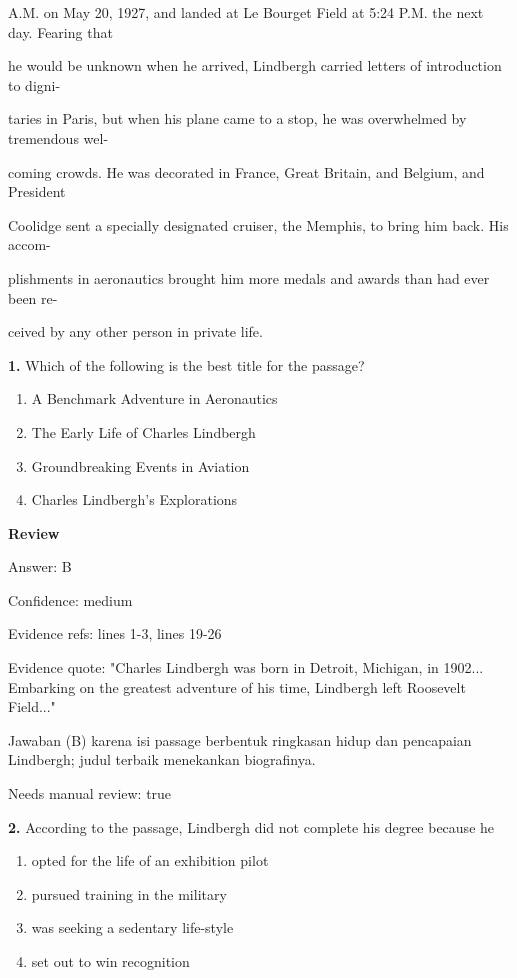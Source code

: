 \documentclass[12pt]{article}
\begin{document}
A.M. on May 20, 1927, and landed at Le Bourget Field at 5:24 P.M. the next day. Fearing that\par
he would be unknown when he arrived, Lindbergh carried letters of introduction to digni-\par
taries in Paris, but when his plane came to a stop, he was overwhelmed by tremendous wel-\par
coming crowds. He was decorated in France, Great Britain, and Belgium, and President\par
Coolidge sent a specially designated cruiser, the Memphis, to bring him back. His accom-\par
plishments in aeronautics brought him more medals and awards than had ever been re-\par
ceived by any other person in private life.\par
\endgroup
\medskip
\noindent\textbf{1.} Which of the following is the best title for the passage?
\begin{enumerate}[label=(\Alph*),leftmargin=*,itemsep=0.2em]
\item A Benchmark Adventure in Aeronautics
\item The Early Life of Charles Lindbergh
\item Groundbreaking Events in Aviation
\item Charles Lindbergh's Explorations
\end{enumerate}
\par
\begingroup
\setlength{\parskip}{0pt}
\setlength{\parindent}{0pt}
\textbf{Review}\par
Answer: B\par
Confidence: medium\par
Evidence refs: lines 1-3, lines 19-26\par
Evidence quote: "Charles Lindbergh was born in Detroit, Michigan, in 1902... Embarking on the greatest adventure of his time, Lindbergh left Roosevelt Field..."\par
Jawaban (B) karena isi passage berbentuk ringkasan hidup dan pencapaian Lindbergh; judul terbaik menekankan biografinya.\par
Needs manual review: true\par
\endgroup
\par
\vspace{0.25\baselineskip}
\noindent\textbf{2.} According to the passage, Lindbergh did not complete his degree because he
\begin{enumerate}[label=(\Alph*),leftmargin=*,itemsep=0.2em]
\item opted for the life of an exhibition pilot
\item pursued training in the military
\item was seeking a sedentary life-style
\item set out to win recognition
\end{enumerate}
\end{document}

